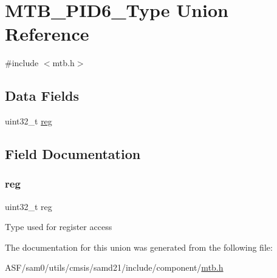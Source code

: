 \hypertarget{union_m_t_b___p_i_d6___type}{}\section{M\+T\+B\+\_\+\+P\+I\+D6\+\_\+\+Type Union Reference}
\label{union_m_t_b___p_i_d6___type}


{\ttfamily \#include $<$mtb.\+h$>$}

\subsection*{Data Fields}
\begin{DoxyCompactItemize}
\item 
uint32\+\_\+t \mbox{\hyperlink{union_m_t_b___p_i_d6___type_a6b91636401516a477989a336376d7b40}{reg}}
\end{DoxyCompactItemize}


\subsection{Field Documentation}
\mbox{\label{union_m_t_b___p_i_d6___type_a6b91636401516a477989a336376d7b40}} 
\subsubsection{\texorpdfstring{reg}{reg}}
{\footnotesize\ttfamily uint32\+\_\+t reg}

Type used for register access 

The documentation for this union was generated from the following file\+:\begin{DoxyCompactItemize}
\item 
A\+S\+F/sam0/utils/cmsis/samd21/include/component/\mbox{\hyperlink{component_2mtb_8h}{mtb.\+h}}\end{DoxyCompactItemize}
